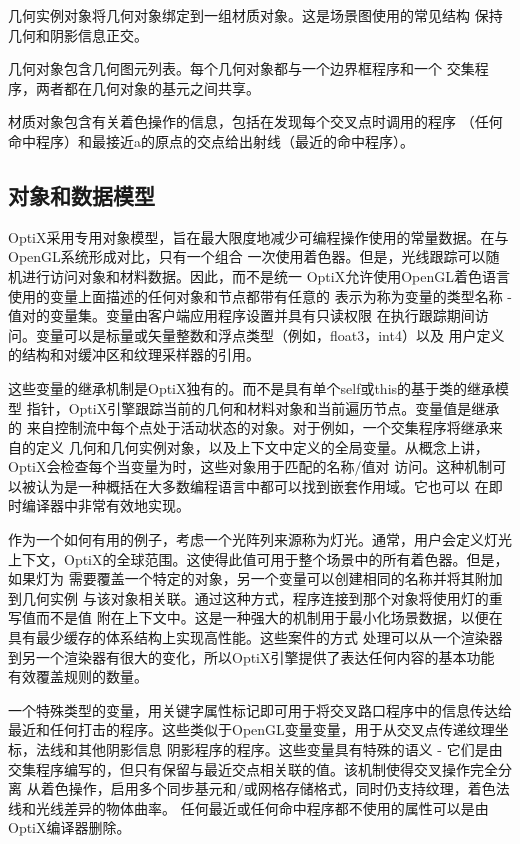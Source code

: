几何实例对象将几何对象绑定到一组材质对象。这是场景图使用的常见结构
保持几何和阴影信息正交。

几何对象包含几何图元列表。每个几何对象都与一个边界框程序和一个
交集程序，两者都在几何对象的基元之间共享。

材质对象包含有关着色操作的信息，包括在发现每个交叉点时调用的程序
（任何命中程序）和最接近a的原点的交点给出射线（最近的命中程序）。

\subsection{对象和数据模型}

OptiX采用专用对象模型，旨在最大限度地减少可编程操作使用的常量数据。在与OpenGL系统形成对比，只有一个组合
一次使用着色器。但是，光线跟踪可以随机进行访问对象和材料数据。因此，而不是统一
OptiX允许使用OpenGL着色语言使用的变量上面描述的任何对象和节点都带有任意的
表示为称为变量的类型名称 - 值对的变量集。变量由客户端应用程序设置并具有只读权限
在执行跟踪期间访问。变量可以是标量或矢量整数和浮点类型（例如，float3，int4）以及
用户定义的结构和对缓冲区和纹理采样器的引用。

这些变量的继承机制是OptiX独有的。而不是具有单个self或this的基于类的继承模型
指针，OptiX引擎跟踪当前的几何和材料对象和当前遍历节点。变量值是继承的
来自控制流中每个点处于活动状态的对象。对于例如，一个交集程序将继承来自的定义
几何和几何实例对象，以及上下文中定义的全局变量。从概念上讲，OptiX会检查每个当变量为时，这些对象用于匹配的名称/值对
访问。这种机制可以被认为是一种概括在大多数编程语言中都可以找到嵌套作用域。它也可以
在即时编译器中非常有效地实现。

作为一个如何有用的例子，考虑一个光阵列来源称为灯光。通常，用户会定义灯光
上下文，OptiX的全球范围。这使得此值可用于整个场景中的所有着色器。但是，如果灯为
需要覆盖一个特定的对象，另一个变量可以创建相同的名称并将其附加到几何实例
与该对象相关联。通过这种方式，程序连接到那个对象将使用灯的重写值而不是值
附在上下文中。这是一种强大的机制用于最小化场景数据，以便在具有最少缓存的体系结构上实现高性能。这些案件的方式
处理可以从一个渲染器到另一个渲染器有很大的变化，所以OptiX引擎提供了表达任何内容的基本功能
有效覆盖规则的数量。

一个特殊类型的变量，用关键字属性标记即可用于将交叉路口程序中的信息传达给
最近和任何打击的程序。这些类似于OpenGL变量变量，用于从交叉点传递纹理坐标，法线和其他阴影信息
阴影程序的程序。这些变量具有特殊的语义 - 它们是由交集程序编写的，但只有保留与最近交点相关联的值。该机制使得交叉操作完全分离
从着色操作，启用多个同步基元和/或网格存储格式，同时仍支持纹理，着色法线和光线差异的物体曲率。
任何最近或任何命中程序都不使用的属性可以是由OptiX编译器删除。

